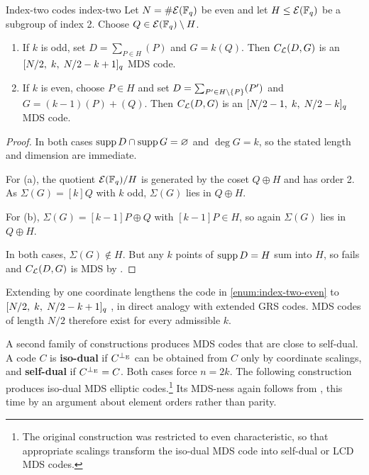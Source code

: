 \documentclass[twocolumn, 11pt]{scrartcl}
\begin{document}
\begin{construction}{Index-two codes \cite{wang2025nonrs}}{index-two}
    Let $N=\#\mathcal{E}(\mathbb{F}_q)$ be even and let $H\leq\mathcal{E}(\mathbb{F}_q)$ be a subgroup of index 2. Choose $Q\in\mathcal{E}(\mathbb{F}_q)\setminus H$.
    \begin{enumerate}[label={(\alph*)}, left=-4pt, topsep=2pt, itemsep=0pt]
        \item If $k$ is odd, set $D=\sum_{P\in H}(P)$ and $G=k(Q)$. Then $C_\mathcal{L}(D,G)$ is an $[N/2,\;k,\;N/2-k+1]_q$ MDS code.
        \item \label{enum:index-two-even} If $k$ is even, choose $P\in H$ and set $D=\sum_{P'\in H\setminus\{P\}}(P')$ and $G=(k-1)(P)+(Q)$. Then $C_\mathcal{L}(D,G)$ is an $[N/2-1,\;k,\;N/2-k]_q$ MDS code.
    \end{enumerate}
\end{construction}

\begin{proof}
In both cases $\operatorname{supp} D\cap\operatorname{supp} G=\varnothing$ and $\deg G=k$, so the stated length and dimension are immediate.

For (a), the quotient $\mathcal{E}(\mathbb{F}_q)/H$ is generated by the coset $Q\oplus H$ and has order 2. As $\Sigma(G)=[k]Q$ with $k$ odd, $\Sigma(G)$ lies in $Q\oplus H$.

For (b), $\Sigma(G)=[k-1]P\oplus Q$ with $[k-1]P\in H$, so again $\Sigma(G)$ lies in $Q\oplus H$.

In both cases, $\Sigma(G)\notin H$. But any $k$ points of $\operatorname{supp} D=H$ sum into $H$, so  fails and $C_\mathcal{L}(D,G)$ is MDS by .
\end{proof}

Extending by one coordinate lengthens the code in \ref{enum:index-two-even} to $[N/2,\;k,\;N/2-k+1]_q$ \cite{mh4310ld7}, in direct analogy with extended GRS codes. MDS codes of length $N/2$ therefore exist for every admissible $k$.

A second family of constructions produces MDS codes that are close to self-dual. A code $C$ is \textbf{iso-dual} if $C^{\perp_\mathrm{E}}$ can be obtained from $C$ only by coordinate scalings, and \textbf{self-dual} if $C^{\perp_\mathrm{E}}=C$. Both cases force $n=2k$. The following construction produces iso-dual MDS elliptic codes.\footnote{The original construction \cite[Construction~1]{zhu2026isodual} was restricted to even characteristic, so that appropriate scalings transform the iso-dual MDS code into self-dual or LCD MDS codes.} Its MDS-ness again follows from , this time by an argument about element orders rather than parity.
\end{document}
